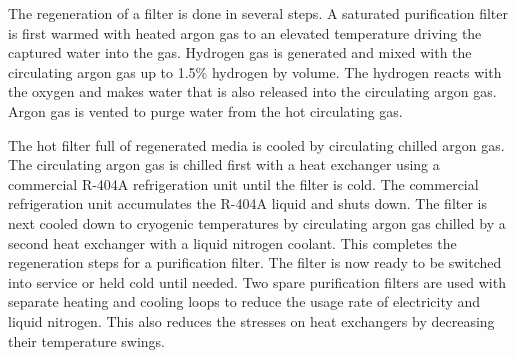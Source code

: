 The regeneration of a filter is done in several steps. A saturated 
purification filter is first warmed with heated argon gas to an 
elevated temperature driving the captured water into the gas. 
Hydrogen gas is generated and mixed with the circulating argon 
gas up to 1.5\% hydrogen by volume. The hydrogen reacts with the 
oxygen and makes water that is also released into the circulating 
argon gas. Argon gas is vented to purge water from the hot 
circulating gas. 

The hot filter full of regenerated media is cooled by circulating 
chilled argon gas. The circulating argon gas is chilled first with 
a heat exchanger using a commercial R-404A refrigeration unit until 
the filter is cold. The commercial refrigeration unit accumulates 
the R-404A liquid and shuts down. The filter is next cooled down to 
cryogenic temperatures by circulating argon gas chilled by a second 
heat exchanger with a liquid nitrogen coolant. This completes the 
regeneration steps for a purification filter. The filter is now 
ready to be switched into service or held cold until needed. Two 
spare purification filters are used with separate heating and 
cooling loops to reduce the usage rate of electricity and liquid 
nitrogen. This also reduces the stresses on heat exchangers by 
decreasing their temperature swings.

